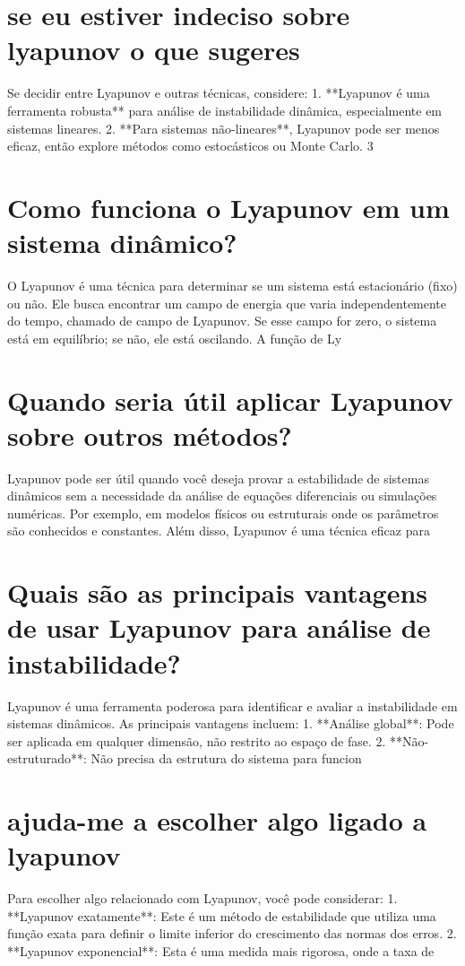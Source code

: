\documentclass[11pt,a4paper]{article}
\begin{document}
\section{se eu estiver indeciso sobre lyapunov o que sugeres}
Se decidir entre Lyapunov e outras técnicas, considere: 1. **Lyapunov é uma ferramenta robusta** para análise de instabilidade dinâmica, especialmente em sistemas lineares. 2. **Para sistemas não-lineares**, Lyapunov pode ser menos eficaz, então explore métodos como estocásticos ou Monte Carlo. 3

\section{Como funciona o Lyapunov em um sistema dinâmico?}
O Lyapunov é uma técnica para determinar se um sistema está estacionário (fixo) ou não. Ele busca encontrar um campo de energia que varia independentemente do tempo, chamado de campo de Lyapunov. Se esse campo for zero, o sistema está em equilíbrio; se não, ele está oscilando. A função de Ly

\section{Quando seria útil aplicar Lyapunov sobre outros métodos?}
Lyapunov pode ser útil quando você deseja provar a estabilidade de sistemas dinâmicos sem a necessidade da análise de equações diferenciais ou simulações numéricas. Por exemplo, em modelos físicos ou estruturais onde os parâmetros são conhecidos e constantes. Além disso, Lyapunov é uma técnica eficaz para

\section{Quais são as principais vantagens de usar Lyapunov para análise de instabilidade?}
Lyapunov é uma ferramenta poderosa para identificar e avaliar a instabilidade em sistemas dinâmicos. As principais vantagens incluem: 1. **Análise global**: Pode ser aplicada em qualquer dimensão, não restrito ao espaço de fase. 2. **Não-estruturado**: Não precisa da estrutura do sistema para funcion

\section{ajuda-me a escolher algo ligado a lyapunov}
Para escolher algo relacionado com Lyapunov, você pode considerar: 1. **Lyapunov exatamente**: Este é um método de estabilidade que utiliza uma função exata para definir o limite inferior do crescimento das normas dos erros. 2. **Lyapunov exponencial**: Esta é uma medida mais rigorosa, onde a taxa de
\end{document}
